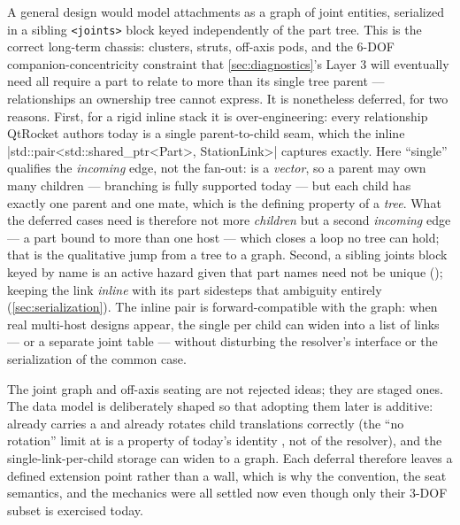 \begin{rejected}
A general design would model attachments as a graph of joint entities, serialized in a
sibling \texttt{<joints>} block keyed independently of the part tree. This is the
correct long-term chassis: clusters, struts, off-axis pods, and the 6-DOF
companion-concentricity constraint that \cref{sec:diagnostics}'s Layer 3 will eventually need
all require a part to relate to more than its single tree parent --- relationships an
ownership tree cannot express. It is nonetheless deferred, for two reasons. First, for a
rigid inline stack it is over-engineering: every relationship QtRocket authors today is a
single parent-to-child seam, which the inline \cppinline|std::pair<std::shared_ptr<Part>, StationLink>|
captures exactly. Here ``single'' qualifies the \emph{incoming} edge, not the fan-out:
 is a \emph{vector}, so a parent may own many children --- branching is fully
supported today --- but each child has exactly one parent and one mate, which is the defining
property of a \emph{tree}. What the deferred cases need is therefore not more \emph{children} but a
second \emph{incoming} edge --- a part bound to more than one host --- which closes a loop no tree can
hold; that is the qualitative jump from a tree to a graph. Second, a sibling joints block keyed by name is an active hazard given
that part names need not be unique (); keeping the link
\emph{inline} with its part sidesteps that ambiguity entirely (\cref{sec:serialization}).
The inline pair is forward-compatible with the graph: when real multi-host designs appear,
the single  per child can widen into a list of links --- or a separate
joint table --- without disturbing the resolver's interface or the serialization of the
common case.
\end{rejected}

\begin{keyinsight}
The joint graph and off-axis seating are not rejected ideas; they are staged ones. The data
model is deliberately shaped so that adopting them later is additive:  already
carries a  and  already rotates child translations
correctly (the ``no rotation'' limit at  is a property of
today's identity , not of the resolver), and the single-link-per-child
storage can widen to a graph. Each deferral therefore leaves a defined extension point
rather than a wall, which is why the convention, the seat semantics, and the 
mechanics were all settled now even though only their 3-DOF subset is exercised today.
\end{keyinsight}
